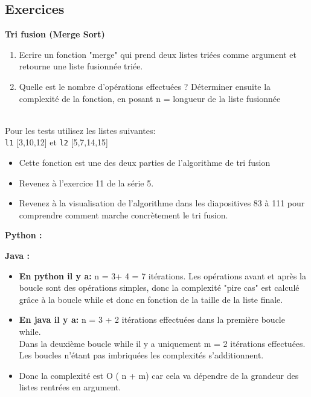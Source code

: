 \subsection{Exercices}
     \begin{Exercice} [15 minutes] \textbf{Tri fusion (Merge Sort)}
    \begin{enumerate}
        \item  Ecrire un fonction "merge" qui prend deux listes triées comme argument et retourne une liste fusionnée triée.
        \item Quelle est le nombre d'opérations effectuées ? Déterminer ensuite la complexité de la fonction, en posant n = longueur de la liste fusionnée
    \end{enumerate}\\
       
       Pour les tests utilisez les listes suivantes:\\ \lstinline{l1}  [3,10,12] et 
       \lstinline{l2}  [5,7,14,15]
    \begin{conseil}
    \begin{itemize}
        \item Cette fonction est une des deux parties de l'algorithme de tri fusion
        \item Revenez à l'exercice 11 de la série 5. 
        \item Revenez à la visualisation de l'algorithme dans les diapositives 83 à 111 pour comprendre comment marche concrètement le tri fusion. 
    \end{itemize}
    \end{conseil}
    \begin{solution}
        \textbf{Python :}
         
        \textbf{Java :}
         
    \end{solution}
    \begin{solution}
    \begin{itemize}
    \item \textbf{En python il y a:} n = 3+ 4 = 7 itérations. Les opérations avant et après la boucle sont des opérations simples, donc la complexité "pire cas" est calculé grâce à la boucle while et donc en fonction de la taille de la liste finale.
    \item \textbf{En java il y a:} n = 3 + 2 itérations effectuées dans la première boucle while. \\ Dans la deuxième boucle while il y a uniquement m = 2 itérations effectuées. Les boucles n'étant pas imbriquées les complexités s'additionnent. 
    \item Donc la complexité est O ( n + m) car cela va dépendre de la grandeur des listes rentrées en argument.
    \end{itemize}
    \end{solution}
\end{Exercice}
    
